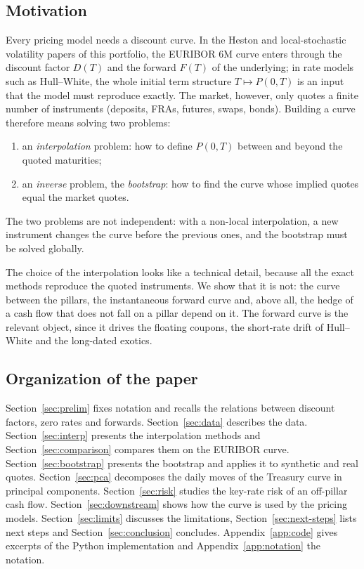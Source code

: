 \documentclass[11pt,a4paper]{article}
\theoremstyle{plain}
\theoremstyle{definition}
\begin{document}
\subsection{Motivation}
Every pricing model needs a discount curve. In the Heston and local-stochastic volatility papers of this portfolio, the EURIBOR 6M curve enters through the discount factor $D(T)$ and the forward $F(T)$ of the underlying; in rate models such as Hull--White, the whole initial term structure $T\mapsto P(0,T)$ is an input that the model must reproduce exactly. The market, however, only quotes a finite number of instruments (deposits, FRAs, futures, swaps, bonds). Building a curve therefore means solving two problems:
\begin{enumerate}[label=(\roman*)]
    \item an \emph{interpolation} problem: how to define $P(0,T)$ between and beyond the quoted maturities;
    \item an \emph{inverse} problem, the \emph{bootstrap}: how to find the curve whose implied quotes equal the market quotes.
\end{enumerate}
The two problems are not independent: with a non-local interpolation, a new instrument changes the curve before the previous ones, and the bootstrap must be solved globally.

The choice of the interpolation looks like a technical detail, because all the exact methods reproduce the quoted instruments. We show that it is not: the curve between the pillars, the instantaneous forward curve and, above all, the hedge of a cash flow that does not fall on a pillar depend on it. The forward curve is the relevant object, since it drives the floating coupons, the short-rate drift of Hull--White and the long-dated exotics.

\subsection{Organization of the paper}
Section~\ref{sec:prelim} fixes notation and recalls the relations between discount factors, zero rates and forwards. Section~\ref{sec:data} describes the data. Section~\ref{sec:interp} presents the interpolation methods and Section~\ref{sec:comparison} compares them on the EURIBOR curve. Section~\ref{sec:bootstrap} presents the bootstrap and applies it to synthetic and real quotes. Section~\ref{sec:pca} decomposes the daily moves of the Treasury curve in principal components. Section~\ref{sec:risk} studies the key-rate risk of an off-pillar cash flow. Section~\ref{sec:downstream} shows how the curve is used by the pricing models. Section~\ref{sec:limits} discusses the limitations, Section~\ref{sec:next-steps} lists next steps and Section~\ref{sec:conclusion} concludes. Appendix~\ref{app:code} gives excerpts of the Python implementation and Appendix~\ref{app:notation} the notation.
\end{document}
